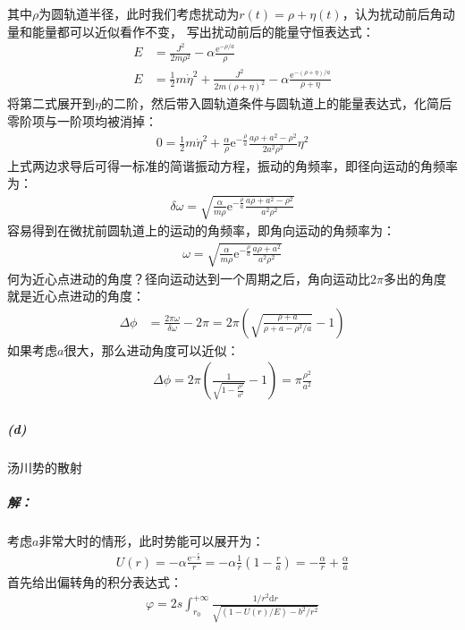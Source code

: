 \documentclass[a4paper]{ctexart}
\def\d{\mathrm{d}}
\def\e{\mathrm{e}}
\begin{document}
    其中$\rho$为圆轨道半径，此时我们考虑扰动为$r(t) = \rho + \eta(t)$，认为扰动前后角动量和能量都可以近似看作不变，
    写出扰动前后的能量守恒表达式：
    \begin{align}
        E &= \frac{J^{2}}{2m\rho^{2}} - \alpha\frac{\e^{-\rho/a}}{\rho}\\
        E &= \frac{1}{2}m\dot{\eta}^{2} + \frac{J^{2}}{2m(\rho + \eta)^{2}} - \alpha\frac{\e^{-(\rho + \eta)/a}}{\rho + \eta}
    \end{align}
    将第二式展开到$\eta$的二阶，然后带入圆轨道条件与圆轨道上的能量表达式，化简后零阶项与一阶项均被消掉：
    \begin{align}
        0 = \frac{1}{2}m\dot{\eta}^{2} + \frac{\alpha}{\rho}\e ^{-\frac{\rho}{a}}\frac{a\rho + a^{2} - \rho^{2}}{2a^{2}\rho^{2}}\eta^{2}
    \end{align}
    上式两边求导后可得一标准的简谐振动方程，振动的角频率，即径向运动的角频率为：
    \begin{align}
        \delta\omega = \sqrt{\frac{\alpha}{m\rho}\e ^{-\frac{\rho}{a}}\frac{a\rho + a^{2} - \rho^{2}}{a^{2}\rho^{2}}}
    \end{align}
    容易得到在微扰前圆轨道上的运动的角频率，即角向运动的角频率为：
    \begin{align}
        \omega = \sqrt{\frac{\alpha}{m\rho}\e ^{-\frac{\rho}{a}}\frac{a\rho + a^{2}}{a^{2}\rho^{2}}}
    \end{align}
    何为近心点进动的角度？径向运动达到一个周期之后，角向运动比$2\pi$多出的角度就是近心点进动的角度：
    \begin{align}
        \Delta\phi &= \frac{2\pi\omega}{\delta\omega} - 2\pi = 2\pi\left(\sqrt{\frac{\rho + a}{\rho + a - \rho^{2}/a}} - 1\right)
    \end{align}
    如果考虑$a$很大，那么进动角度可以近似：
    \begin{align}
        \Delta\phi = 2\pi\left(\frac{1}{\sqrt{1 - \frac{\rho^{2}}{a^{2}}}} - 1\right) = \pi\frac{\rho^{2}}{a^{2}}
    \end{align}
    \subparagraph{(d)}汤川势的散射
    \subparagraph{解：}
    考虑$a$非常大时的情形，此时势能可以展开为：
    \begin{align}
        U(r) = -\alpha\frac{\e ^{-\frac{r}{a}}}{r} = -\alpha\frac{1}{r}(1-\frac{r}{a}) = -\frac{\alpha}{r} + \frac{\alpha}{a}
    \end{align}
    首先给出偏转角的积分表达式：
    \begin{align}
        \varphi = 2s\int_{r_{0}}^{+\infty}\frac{1/r^{2}\d r}{\sqrt{(1 - U(r)/E) - b^{2}/r^{2}}}
    \end{align}
\end{document}
